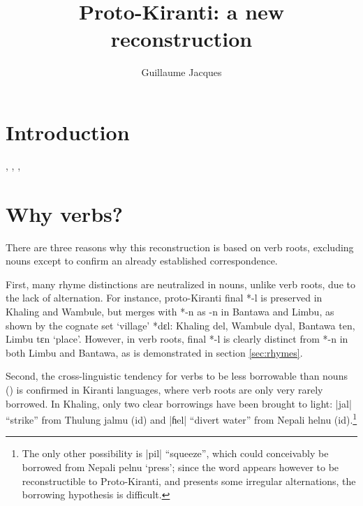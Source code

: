 \documentclass[oldfontcommands,oneside,a4paper,11pt]{article}
\newcommand{\ipa}[1]{{\phon\mbox{#1}}} %
\newcommand{\dhatu}[2]{|\ipa{#1}| ``#2''}
\begin{document}
\title{Proto-Kiranti: a new reconstruction}
\author{Guillaume Jacques}
\maketitle
\sloppy
\section{Introduction}
\citet{starostin94kiranti}, \citet{michailovsky94stops}, \citet{opgenort05jero}, \citet{michailovsky10kiranti}

\citet{opgenort04wambule}
\citet{doornenbal09}
\citet{michailovsky02dico}
\citet{jacques15khaling}
\citet{jacques12khaling}
 
\section{Why verbs?} \label{sec:why}

There are three reasons why this reconstruction is based on verb roots, excluding nouns except to confirm an already established correspondence.

First,  many rhyme distinctions are neutralized in nouns, unlike verb roots, due to the lack of alternation. For instance, proto-Kiranti final *\ipa{-l} is preserved in Khaling and Wambule, but merges with *\ipa{-n} as \ipa{-n} in Bantawa and Limbu, as shown by the cognate set `village' *\ipa{dɛl}: Khaling \ipa{del}, Wambule \ipa{dyal}, Bantawa \ipa{ten}, Limbu \ipa{tɛn} `place'. However, in verb roots, final *\ipa{-l} is clearly distinct from *\ipa{-n} in both Limbu and Bantawa, as is demonstrated in section \ref{sec:rhymes}.

Second, the cross-linguistic tendency for verbs to be less borrowable than nouns (\citealt{wohlgemuth09verbal}) is confirmed in Kiranti languages, where verb roots are only very rarely borrowed. In Khaling, only two clear borrowings have been brought to light: \dhatu{jal}{strike} from Thulung \ipa{jalmu}  (id) and \dhatu{ɦel}{divert water} from Nepali \ipa{helnu} (id).\footnote{The only other possibility is  \dhatu{pil}{squeeze}, which could conceivably be borrowed from Nepali \ipa{pelnu} `press'; since the word appears however to be reconstructible to Proto-Kiranti, and presents some irregular alternations, the borrowing hypothesis is difficult.} 
\end{document}
